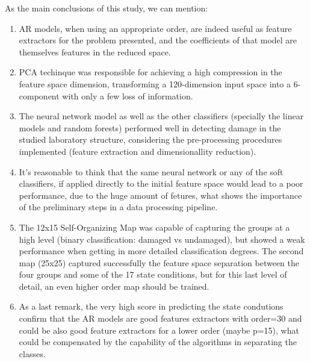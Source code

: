 \documentclass[twocolumn]{article}
\begin{document}
As the main conclusions of this study, we can mention:

\begin{enumerate}
      \item AR models, when using an appropriate order, are indeed useful as feature extractors for the problem presented, and the coefficients of that model are themselves features in the reduced space.

      \item PCA techinque was responsible for achieving a high compression in the feature space dimension, transforming a 120-dimension input space into a 6-component with only a few loss of information.

      \item The neural network model as well as the other classifiers (specially the linear models and random forests) performed well in detecting damage in the studied laboratory structure, considering the pre-processing procedures implemented (feature extraction and dimensionallity reduction).

      \item It's reasonable to think that the same neural network or any of the soft classifiers, if applied directly to the initial feature space would lead to a poor performance, due to the huge amount of fetures, what shows the importance of the preliminary steps in a data processing pipeline.

      \item The 12x15 Self-Organizing Map was capable of capturing the groups at a high level (binary classification: damaged vs undamaged), but showed a weak performance when getting in more detailed classification degrees. The second map (25x25) captured successfully the feature space separation between the four groups and some of the 17 state conditions, but for this last level of detail, an even higher order map should be trained.

      \item As a last remark, the very high score in predicting the state condutions confirm that the AR models are good features extractors with order=30 and could be also good feature extractors for a lower order (maybe p=15), what could be compensated by the capability of the algorithms in separating the classes.
\end{enumerate}

\pagebreak



\end{document}
